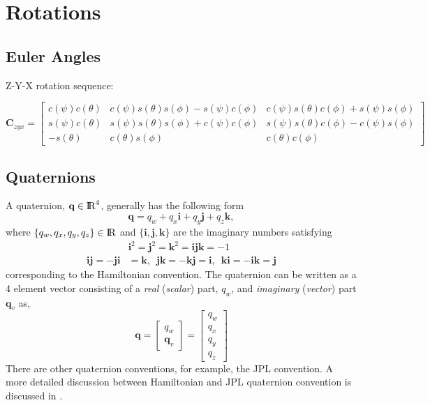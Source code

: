 \documentclass{report}
\renewcommand{\Vec}[1]{{\mathbf{#1}}}
\newcommand{\Mat}[1]{{\mathbf{#1}}}
\newcommand{\real}{{\rm I\!R}}
\newcommand{\quat}{{\Vec{q}}}
\newcommand{\rot}{{\Mat{C}}}
\begin{document}
\chapter{Rotations}

\section{Euler Angles}
Z-Y-X rotation sequence:

\begin{equation}
  \rot_{zyx} =
  \begin{bmatrix}
    c(\psi) c(\theta)
    & c(\psi) s(\theta) s(\phi) - s(\psi) c(\phi)
    & c(\psi) s(\theta) c(\phi) + s(\psi) s(\phi) \\
    s(\psi) c(\theta)
    & s(\psi) s(\theta) s(\phi) + c(\psi) c(\phi)
    & s(\psi) s(\theta) c(\phi) - c(\psi) s(\phi) \\
    -s(\theta) & c(\theta) s(\phi) & c(\theta) c(\phi)
  \end{bmatrix}
\end{equation}



\section{Quaternions}

A quaternion, $\Vec{q} \in \real^{4}$, generally has the following form
%
\begin{equation}
  \quat = q_{w} + q_{x} \mathbf{i} + q_{y} \mathbf{j} + q_{z} \mathbf{k},
\end{equation}
%
where $\{ q_{w}, q_{x}, q_{y}, q_{z} \} \in \real$ and $\{ \mathbf{i}, \mathbf{j},
\mathbf{k} \}$ are the imaginary numbers satisfying
%
\begin{equation}
\begin{split}
  &\mathbf{i}^{2}
  = \mathbf{j}^{2}
  = \mathbf{k}^{2}
  = \mathbf{ijk}
  = -1 \\
  \mathbf{ij} = -\mathbf{ji} &= \mathbf{k}, \enspace
  \mathbf{jk} = -\mathbf{kj} = \mathbf{i}, \enspace
  \mathbf{ki} = -\mathbf{ik} = \mathbf{j}
\end{split}
\end{equation}
%
corresponding to the Hamiltonian convention. The quaternion can be written as a
4 element vector consisting of a \textit{real} (\textit{scalar}) part, $q_{w}$,
and \textit{imaginary} (\textit{vector}) part $\quat_{v}$ as,
%
\begin{equation}
  \quat =
  \begin{bmatrix} q_{w} \\ \quat_{v} \end{bmatrix} =
  \begin{bmatrix} q_{w} \\ q_{x} \\ q_{y} \\ q_{z} \end{bmatrix}
\end{equation}
%
There are other quaternion conventions, for example, the JPL convention. A more
detailed discussion between Hamiltonian and JPL quaternion convention is
discussed in \cite{Sola2017}.
\end{document}
